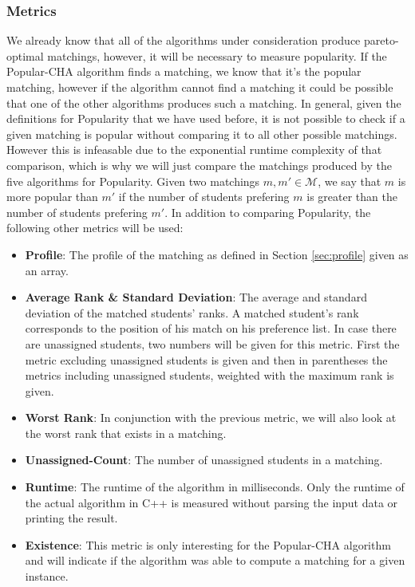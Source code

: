\subsubsection{Metrics}
We already know that all of the algorithms under consideration produce pareto-optimal matchings, however, it will be necessary to measure popularity. If the Popular-CHA algorithm finds a matching, we know that it's the popular matching, however if the algorithm cannot find a matching it could be possible that one of the other algorithms produces such a matching. In general, given the definitions for Popularity that we have used before, it is not possible to check if a given matching is popular without comparing it to all other possible matchings. However this is infeasable due to the exponential runtime complexity of that comparison, which is why we will just compare the matchings produced by the five algorithms for Popularity. Given two matchings $m, m' \in \mathcal{M}$, we say that $m$ is more popular than $m'$ if the number of students prefering $m$ is greater than the number of students prefering $m'$. 
In addition to comparing Popularity, the following other metrics will be used:
\begin{itemize}
  \item \textbf{Profile}: The profile of the matching as defined in Section \ref{sec:profile} given as an array.
  \item \textbf{Average Rank \& Standard Deviation}: The average and standard deviation of the matched students' ranks. A matched student's rank corresponds to the position of his match on his preference list. In case there are unassigned students, two numbers will be given for this metric. First the metric excluding unassigned students is given and then in parentheses the metrics including unassigned students, weighted with the maximum rank is given.
  \item \textbf{Worst Rank}: In conjunction with the previous metric, we will also look at the worst rank that exists in a matching.
  \item \textbf{Unassigned-Count}: The number of unassigned students in a matching.
  \item \textbf{Runtime}: The runtime of the algorithm in milliseconds. Only the runtime of the actual algorithm in C++ is measured without parsing the input data or printing the result.
  \item \textbf{Existence}: This metric is only interesting for the Popular-CHA algorithm and will indicate if the algorithm was able to compute a matching for a given instance.
\end{itemize}

